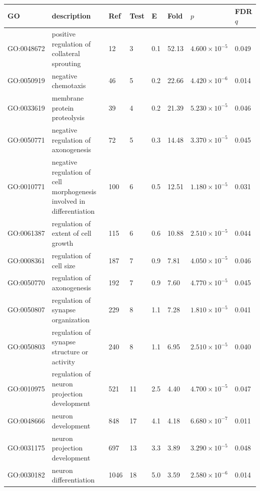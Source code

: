 \begin{table}[ht]
\centering
 \setlength{\extrarowheight}{2pt}
\begin{adjustbox}{width=\textwidth}
\begin{tabular}{llllllll}
  \toprule
GO & description & Ref & Test & E & Fold & $p$ & FDR $q$ \\ 
  \midrule
GO:0048672 & positive regulation of collateral sprouting  & 12 & 3 & 0.1 & 52.13 & $4.600 \times 10^{-5}$ & 0.049 \\ 
  GO:0050919 & negative chemotaxis  & 46 & 5 & 0.2 & 22.66 & $4.420 \times 10^{-6}$ & 0.014 \\ 
  GO:0033619 & membrane protein proteolysis  & 39 & 4 & 0.2 & 21.39 & $5.230 \times 10^{-5}$ & 0.046 \\ 
  GO:0050771 & negative regulation of axonogenesis  & 72 & 5 & 0.3 & 14.48 & $3.370 \times 10^{-5}$ & 0.045 \\ 
  GO:0010771 & \makecell{negative regulation of cell morphogenesis\\ involved in differentiation}  & 100 & 6 & 0.5 & 12.51 & $1.180 \times 10^{-5}$ & 0.031 \\ 
  GO:0061387 & regulation of extent of cell growth  & 115 & 6 & 0.6 & 10.88 & $2.510 \times 10^{-5}$ & 0.044 \\ 
  GO:0008361 & regulation of cell size  & 187 & 7 & 0.9 & 7.81 & $4.050 \times 10^{-5}$ & 0.046 \\ 
  GO:0050770 & regulation of axonogenesis  & 192 & 7 & 0.9 & 7.60 & $4.770 \times 10^{-5}$ & 0.045 \\ 
  GO:0050807 & regulation of synapse organization  & 229 & 8 & 1.1 & 7.28 & $1.810 \times 10^{-5}$ & 0.041 \\ 
  GO:0050803 & regulation of synapse structure or activity  & 240 & 8 & 1.1 & 6.95 & $2.510 \times 10^{-5}$ & 0.040 \\ 
  GO:0010975 & regulation of neuron projection development  & 521 & 11 & 2.5 & 4.40 & $4.700 \times 10^{-5}$ & 0.047 \\ 
  GO:0048666 & neuron development  & 848 & 17 & 4.1 & 4.18 & $6.680 \times 10^{-7}$ & 0.011 \\ 
  GO:0031175 & neuron projection development  & 697 & 13 & 3.3 & 3.89 & $3.290 \times 10^{-5}$ & 0.048 \\ 
  GO:0030182 & neuron differentiation  & 1046 & 18 & 5.0 & 3.59 & $2.580 \times 10^{-6}$ & 0.014 \\ 

\end{tabular}
\end{adjustbox}
\end{table}
